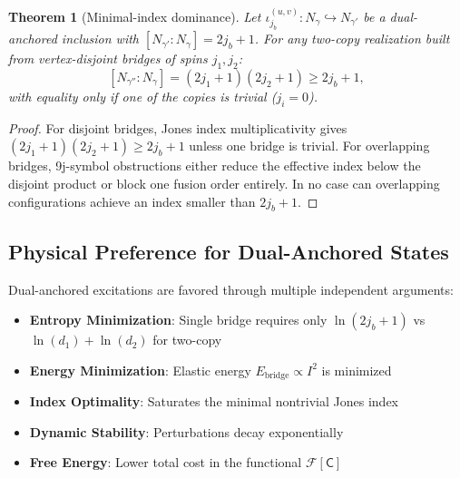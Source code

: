 \documentclass[11pt]{article}
\newcommand{\Index}[2]{\left[#1:#2\right]}
\theoremstyle{plain}
\newtheorem{theorem}{Theorem}[section]
\theoremstyle{definition}
\begin{document}
\begin{theorem}[Minimal-index dominance]\label{thm:min-index-dominance}
  Let $\iota^{(u,v)}_{j_b}:N_\gamma\hookrightarrow N_{\gamma'}$ be a dual-anchored inclusion with $\Index{N_{\gamma'}}{N_\gamma}=2j_b+1$.
  For any two-copy realization built from vertex-disjoint bridges of spins $j_1,j_2$:
  \[
    \Index{N_{\gamma''}}{N_\gamma} = (2j_1+1)(2j_2+1) \geq 2j_b+1,
  \]
  with equality only if one of the copies is trivial ($j_i=0$).
\end{theorem}

\begin{proof}
  For disjoint bridges, Jones index multiplicativity gives $(2j_1+1)(2j_2+1) \geq 2j_b+1$ unless one bridge is trivial. For overlapping bridges, 9j-symbol obstructions either reduce the effective index below the disjoint product or block one fusion order entirely. In no case can overlapping configurations achieve an index smaller than $2j_b+1$.
\end{proof}

\subsection{Physical Preference for Dual-Anchored States}

\begin{tcolorbox}[title=Why Dual-Anchored Excitations are Physically Preferred]
  Dual-anchored excitations are favored through multiple independent arguments:
  \begin{itemize}
    \item \textbf{Entropy Minimization}: Single bridge requires only $\ln(2j_b+1)$ vs $\ln(d_1) + \ln(d_2)$ for two-copy
    \item \textbf{Energy Minimization}: Elastic energy $E_{\text{bridge}} \propto I^2$ is minimized
    \item \textbf{Index Optimality}: Saturates the minimal nontrivial Jones index
    \item \textbf{Dynamic Stability}: Perturbations decay exponentially
    \item \textbf{Free Energy}: Lower total cost in the functional $\mathcal{F}[\mathsf{C}]$
  \end{itemize}
\end{tcolorbox}
\end{document}
